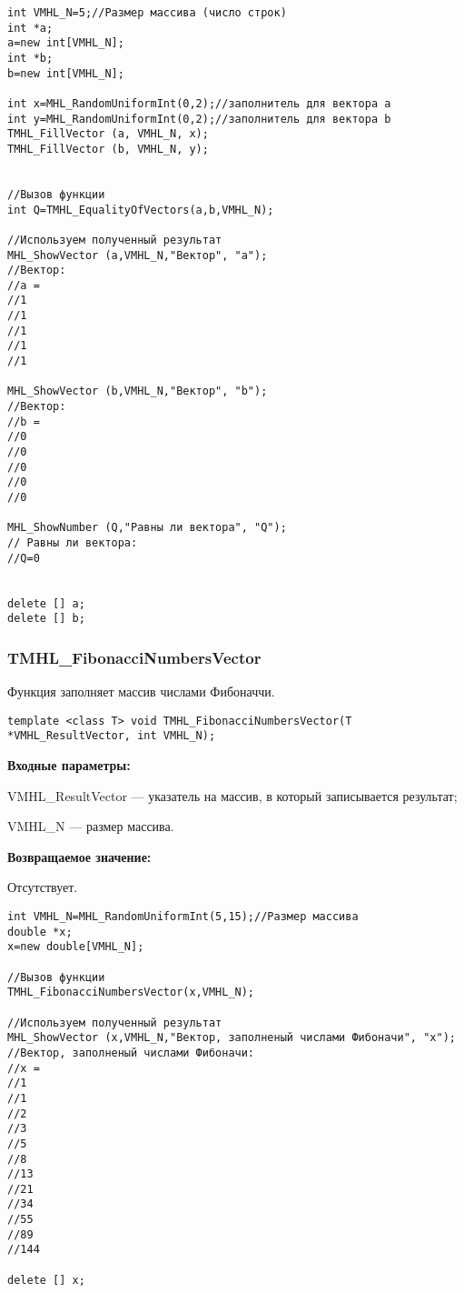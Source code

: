 \documentclass[a4paper,12pt]{article}
\begin{document}
\begin{lstlisting}[label=code_use_TMHL_EqualityOfVectors,caption=Пример использования]
int VMHL_N=5;//Размер массива (число строк)
int *a;
a=new int[VMHL_N];
int *b;
b=new int[VMHL_N];

int x=MHL_RandomUniformInt(0,2);//заполнитель для вектора a
int y=MHL_RandomUniformInt(0,2);//заполнитель для вектора b
TMHL_FillVector (a, VMHL_N, x);
TMHL_FillVector (b, VMHL_N, y);


//Вызов функции
int Q=TMHL_EqualityOfVectors(a,b,VMHL_N);

//Используем полученный результат
MHL_ShowVector (a,VMHL_N,"Вектор", "a");
//Вектор:
//a =
//1
//1
//1
//1
//1

MHL_ShowVector (b,VMHL_N,"Вектор", "b");
//Вектор:
//b =
//0
//0
//0
//0
//0

MHL_ShowNumber (Q,"Равны ли вектора", "Q");
// Равны ли вектора:
//Q=0


delete [] a;
delete [] b;
\end{lstlisting}

\subsubsection{TMHL\_FibonacciNumbersVector}\label{TMHL_FibonacciNumbersVector}

Функция заполняет массив числами Фибоначчи.


\begin{lstlisting}[label=code_syntax_TMHL_FibonacciNumbersVector,caption=Синтаксис]
template <class T> void TMHL_FibonacciNumbersVector(T *VMHL_ResultVector, int VMHL_N);
\end{lstlisting}

\textbf{Входные параметры:}

 VMHL\_ResultVector --- указатель на массив, в который записывается результат;
 
 VMHL\_N --- размер массива.

\textbf{Возвращаемое значение:}

Отсутствует.


\begin{lstlisting}[label=code_use_TMHL_FibonacciNumbersVector,caption=Пример использования]
int VMHL_N=MHL_RandomUniformInt(5,15);//Размер массива
double *x;
x=new double[VMHL_N];

//Вызов функции
TMHL_FibonacciNumbersVector(x,VMHL_N);

//Используем полученный результат
MHL_ShowVector (x,VMHL_N,"Вектор, заполненый числами Фибоначи", "x");
//Вектор, заполненый числами Фибоначи:
//x =	
//1
//1
//2
//3
//5
//8
//13
//21
//34
//55
//89
//144

delete [] x;
\end{lstlisting}
\end{document}
